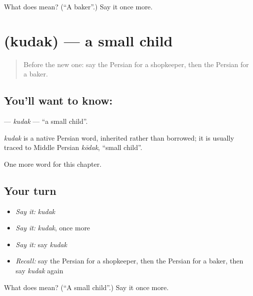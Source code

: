 \begin{tcolorbox}[breakable,colback=teal!4,colframe=teal!35!black,title={Before you move on}]
What does  mean? (\textquotedblleft{}A baker\textquotedblright{}.) Say it once more.
\end{tcolorbox}
\section[\texorpdfstring{\fa{کودک} (kudak)}{کودک (kudak)}]{ (kudak) — a small child}

\label{lesson:FA-C116-kudak}



\begin{quote}
Before the new one: say the Persian for a shopkeeper, then the Persian for a baker.
\end{quote}

\subsection*{You'll want to know: }
\textbf{} — \emph{kudak} — \textquotedblleft{}a small child\textquotedblright{}.

\begin{cousinweb}
\emph{kudak} is a native Persian word, inherited rather than borrowed; it is usually traced to Middle Persian \emph{kōdak}, \textquotedblleft{}small child\textquotedblright{}.
\end{cousinweb}

\begin{grammarlens}[title={What you've built}]
One more word for this chapter.
\end{grammarlens}

\subsection*{Your turn}
\begin{itemize}
\raggedright
  \item \emph{Say it:} \emph{kudak}
  \item \emph{Say it:} \emph{kudak}, once more
  \item \emph{Say it:} say \emph{kudak}
  \item \emph{Recall:} say the Persian for a shopkeeper, then the Persian for a baker, then say \emph{kudak} again
\end{itemize}

\begin{tcolorbox}[breakable,colback=teal!4,colframe=teal!35!black,title={Before you move on}]
What does  mean? (\textquotedblleft{}A small child\textquotedblright{}.) Say it once more.
\end{tcolorbox}
